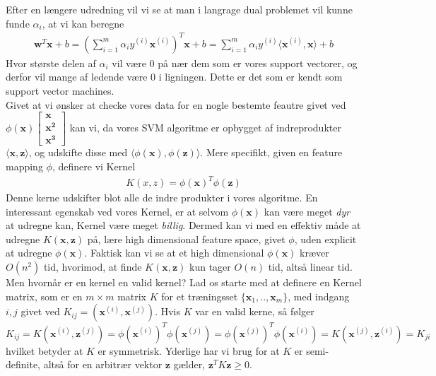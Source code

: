 \documentclass[paper=a4, fontsize=11pt]{scrartcl} %
\numberwithin{equation}{section} %
\numberwithin{figure}{section} %
\numberwithin{table}{section} %
\begin{document}
	Efter en længere udredning vil vi se at man i langrage dual problemet vil kunne funde $\alpha_i$, at vi kan beregne 
	\begin{align*}
	\mathbf{w}^T\mathbf{x}+b=\left(\sum_{i=1}^{m}\alpha_iy^{(i)}\mathbf{x}^{(i)}\right)^T\mathbf{x}+b=\sum_{i=1}^{m}\alpha_i y^{(i)}\langle\mathbf{x}^{(i)},\mathbf{x}\rangle+b
	\end{align*}
	Hvor største delen af $\alpha_i$ vil være $0$ på nær dem som er vores support vectorer, og derfor vil mange af ledende være $0$ i ligningen. Dette er det som er kendt som support vector machines. \\
	
	Givet at vi ønsker at checke vores data for en nogle bestemte feautre givet ved $\phi(\mathbf{x})\left[\begin{matrix} \mathbf{x} \\ \mathbf{x^2} \\ \mathbf{x^3} \end{matrix}\right]$ kan vi, da vores SVM algoritme er opbygget af indreprodukter $\langle \mathbf{x},\mathbf{z}\rangle$, og udskifte disse med $\langle \phi(\mathbf{x}),\phi(\mathbf{z})\rangle$. Mere specifikt, given en feature mapping $\phi$, definere vi Kernel
	\begin{align*}
	K(x,z)=\phi(\mathbf{x})^T\phi(\mathbf{z})
	\end{align*}
	Denne kerne udskifter blot alle de indre produkter i vores algoritme. En interessant egenskab ved vores Kernel, er at selvom $\phi(\mathbf{x})$ kan være meget \textit{dyr} at udregne kan, Kernel være meget \textit{billig}. Dermed kan vi med en effektiv måde at udregne $K(\mathbf{x},\mathbf{z})$ på, lære high dimensional feature space, givet $\phi$, uden explicit at udregne $\phi(\mathbf{x})$. Faktisk kan vi se at et high dimensional $\phi(\mathbf{x})$ kræver $O(n^2)$ tid, hvorimod, at finde $K(\mathbf{x},\mathbf{z})$ kun tager $O(n)$ tid, altså linear tid. \\
	
	Men hvornår er en kernel en valid kernel? Lad os starte med at definere en Kernel matrix, som er en $m\times m$ matrix $K$ for et træningsset $\{\mathbf{x}_1,..,\mathbf{x}_m\}$, med indgang $i,j$ givet ved $K_{ij}=(\mathbf{x}^{(i)},\mathbf{x}^{(j)})$. Hvis $K$ var en valid kerne, så følger $K_{ij}=K(\mathbf{x}^{(i)},\mathbf{z}^{(j)})=\phi(\mathbf{x}^{(i)})^T\phi(\mathbf{x}^{(j)})=\phi(\mathbf{x}^{(j)})^T\phi(\mathbf{x}^{(i)})=K(\mathbf{x}^{(j)},\mathbf{z}^{(i)})=K_{ji}$ hvilket betyder at $K$ er symmetrisk. Yderlige har vi brug for at $K$ er semi-definite, altså for en arbitrær vektor $\mathbf{z}$ gælder, $\mathbf{z}^TK\mathbf{z}\geq0$.
	
\end{document}
